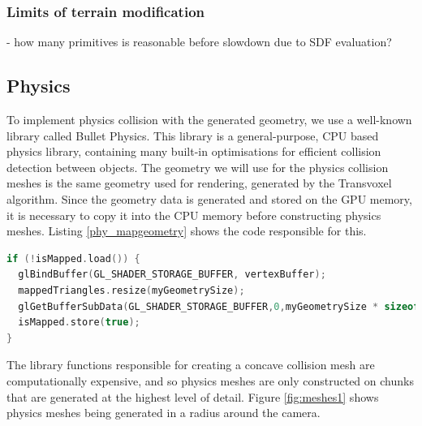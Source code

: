 \documentclass{article}
\begin{document}
\subsubsection{Limits of terrain modification}
 - how many primitives is reasonable before slowdown due to SDF evaluation?\\
 
 \subsection{Physics}
To implement physics collision with the generated geometry, we use a well-known library called Bullet Physics. This library is a general-purpose, CPU based physics library, containing many built-in optimisations for efficient collision detection between objects. %
The geometry we will use for the physics collision meshes is the same geometry used for rendering, generated by the Transvoxel algorithm. Since the geometry data is generated and stored on the GPU memory, it is necessary to copy it into the CPU memory before constructing physics meshes. Listing \ref{phy_mapgeometry} shows the code responsible for this.
\begin{lstlisting}[language=C++,label={phy_mapgeometry},caption={Snippet from the procedure \texttt{mapGeometry} to copy geometry data for a chunk from the GPU to the CPU, to be stored in the array \texttt{mappedTriangles}. \texttt{isMapped} is an atomic boolean storing whether \texttt{mapGeometry} has already been called for this chunk.}]
if (!isMapped.load()) {
  glBindBuffer(GL_SHADER_STORAGE_BUFFER, vertexBuffer);
  mappedTriangles.resize(myGeometrySize);
  glGetBufferSubData(GL_SHADER_STORAGE_BUFFER,0,myGeometrySize * sizeof(glm::vec4),mappedTriangles.data());
  isMapped.store(true);
}
\end{lstlisting}
The library functions responsible for creating a concave collision mesh are computationally expensive, and so physics meshes are only constructed on chunks that are generated at the highest level of detail. Figure \ref{fig:meshes1} shows physics meshes being generated in a radius around the camera.
\end{document}
